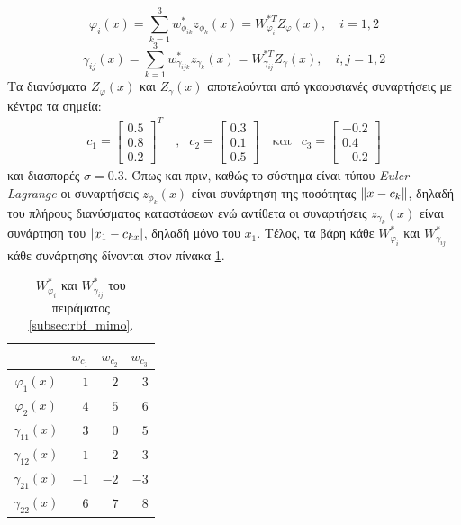 \begin{equation}
	\varphi_i(x) = \sum_{k = 1}^{3} w_{\phi_{ik}}^* z_{\phi_k} (x) = W_{\varphi_i}^{*T} Z_\varphi(x), \quad i = 1,2
	\label{eq:mimo_zphi_def}
\end{equation}
\begin{equation}
\gamma_{ij}(x) = \sum_{k = 1}^{3} w_{\gamma_{ijk}}^* z_{\gamma_k} (x) = W_{\gamma_{ij}}^{*T} Z_{\gamma}(x), \quad i,j = 1,2
\label{eq:mimo_zgamma_def}
\end{equation}
Τα διανύσματα $Z_\varphi(x)$ και $Z_\gamma(x)$ αποτελούνται από γκαουσιανές συναρτήσεις με κέντρα τα σημεία:
\begin{equation*}
\begin{matrix}
c_1 = \begin{bmatrix}  0.5 \\ 0.8 \\  0.2 \end{bmatrix}^Τ & \: \text{,} &
c_2 = \begin{bmatrix}  0.3 \\ 0.1 \\  0.5 \end{bmatrix} & \: \text{και} &
c_3 = \begin{bmatrix} -0.2 \\ 0.4 \\ -0.2 \end{bmatrix} 
\end{matrix}
\end{equation*}
και διασπορές $\sigma = 0.3$. Όπως και πριν, καθώς το σύστημα είναι τύπου \textit{Euler Lagrange} οι συναρτήσεις $z_{\phi_k}(x)$ είναι συνάρτηση της ποσότητας $\norm{x - c_k}$, δηλαδή του πλήρους διανύσματος καταστάσεων ενώ αντίθετα οι συναρτήσεις $z_{\gamma_k}(x)$ είναι συνάρτηση του $\abs{x_1 - c_{kx}}$, δηλαδή μόνο του $x_1$. Τέλος, τα βάρη κάθε $W_{\varphi_i}^{*}$ και $W_{\gamma_{ij}}^{*}$ κάθε συνάρτησης δίνονται στον πίνακα \ref{tab:mimo_wstar}.
\begin{table}
	\centering
	\begin{tabular}{  c || r | r | r }
		\hline\hline
		\text{Συνάρτηση} & $w_{c_1}$ & $w_{c_2}$ & $w_{c_3}$ \\
		\hline\hline
		$\varphi_1(x)$ & $1$ & $2$ & $3$  \\ \hline
		$\varphi_2(x)$ & $4$ & $5$ & $6$  \\ \hline
		$\gamma_{11}(x)$ & $3$ & $0$ & $5$ \\ \hline
		$\gamma_{12}(x)$ & $1$ & $2$ & $3$ \\ \hline
		$\gamma_{21}(x)$ & $-1$ & $-2$ & $-3$ \\ \hline
		$\gamma_{22}(x)$ & $6$ & $7$ & $8$ \\ \hline
	\end{tabular}
	\caption{$W_{\varphi_i}^{*}$ και $W_{\gamma_{ij}}^{*}$ του πειράματος \ref{subsec:rbf_mimo}.}
	\label{tab:mimo_wstar}
\end{table}

